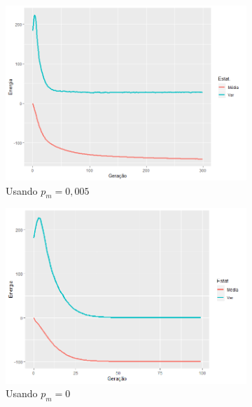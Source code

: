 \begin{figure}[h!]
	\centering
	\begin{subfigure}[b]{0.47\linewidth}
		\includegraphics[width=\linewidth]{imagens/curva_media_var_1.png}
		\caption{Usando \(p_m = 0,005\)}
	\end{subfigure}
	\begin{subfigure}[b]{0.47\linewidth}
		\includegraphics[width=\linewidth]{imagens/curva_media_var_2.png}
		\caption{Usando \(p_m = 0\)}
	\end{subfigure}
	\begin{subfigure}[b]{0.67\linewidth}

\end{subfigure}
\end{figure}
